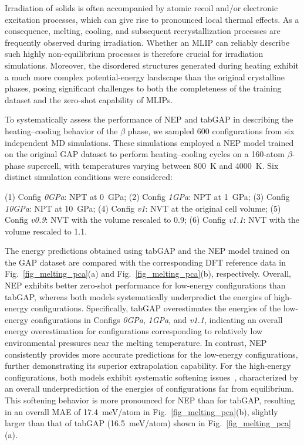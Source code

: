 \documentclass[%
reprint,
superscriptaddress,
 amsmath,amssymb,
 aps,
]{revtex4-2}
\begin{document}
Irradiation of solids is often accompanied by atomic recoil and/or electronic excitation
processes, which can give rise to pronounced local thermal effects.
As a consequence, melting, cooling, and subsequent recrystallization processes are
frequently observed during irradiation.
Whether an MLIP can reliably describe such highly non-equilibrium processes is therefore
crucial for irradiation simulations.
Moreover, the disordered structures generated during heating exhibit a much more complex
potential-energy landscape than the original crystalline phases, posing significant
challenges to both the completeness of the training dataset and the zero-shot capability
of MLIPs.

To systematically assess the performance of NEP and tabGAP in describing the
heating--cooling behavior of the $\beta$ phase, we sampled 600 configurations from six
independent MD simulations.
These simulations employed a NEP model trained on the original GAP dataset to perform 
heating--cooling cycles on a 160-atom $\beta$-phase supercell, with temperatures varying 
between 800~K and 4000~K. 
Six distinct simulation conditions were considered:

\noindent
(1) Config \textit{0GPa}: NPT at 0~GPa; \newline
(2) Config \textit{1GPa}: NPT at 1~GPa; \newline
(3) Config \textit{10GPa}: NPT at 10~GPa; \newline
(4) Config \textit{v1}: NVT at the original cell volume; \newline
(5) Config \textit{v0.9}: NVT with the volume rescaled to 0.9; \newline
(6) Config \textit{v1.1}: NVT with the volume rescaled to 1.1. 

The energy predictions obtained using tabGAP and the NEP model trained on the GAP dataset
are compared with the corresponding DFT reference data in
Fig.~\ref{fig_melting_pca}(a) and Fig.~\ref{fig_melting_pca}(b), respectively.
Overall, NEP exhibits better zero-shot performance for low-energy configurations than
tabGAP, whereas both models systematically underpredict the energies of high-energy
configurations.
Specifically, tabGAP overestimates the energies of the low-energy configurations in
Configs \textit{0GPa}, \textit{1GPa}, and \textit{v1.1}, indicating an overall energy
overestimation for configurations corresponding to relatively low environmental pressures
near the melting temperature.
In contrast, NEP consistently provides more accurate predictions for the low-energy
configurations, further demonstrating its superior extrapolation capability.
For the high-energy configurations, both models exhibit systematic softening 
issues~\cite{deng_systematic_2024}, characterized by an overall underprediction
of the energies of configurations far from equilibrium.
This softening behavior is more pronounced for NEP than for tabGAP, resulting in an overall
MAE of 17.4~meV/atom in Fig.~\ref{fig_melting_pca}(b), slightly larger than that of tabGAP
(16.5~meV/atom) shown in Fig.~\ref{fig_melting_pca}(a).
\end{document}
